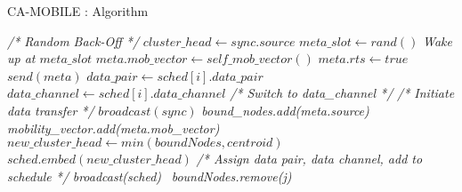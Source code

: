 \begin{algorithm}[H]
	\caption{CA-MOBILE : Algorithm}
	\label{algo:ca-mobile}
\begin{algorithmic}[1]
	\State \emph{/* Random Back-Off */}
	\State $cluster\_head \gets sync.source$
		\State $meta\_slot \gets rand()$
		\State \emph{Wake up at $meta\_slot$}
		\State $meta.mob\_vector \gets self\_mob\_vector()$
			\State $meta.rts \gets true$
		\EndIf
		\State $send(meta)$
				\State $data\_pair \gets sched[i].data\_pair$
				\State $data\_channel \gets sched[i].data\_channel$
			\EndIf
		\EndFor
		\State \emph{/* Switch to data\_channel */}
		\State \emph{/* Initiate data transfer */}
		\EndIf
	\EndWhile
	\Else
		\State $broadcast(sync)$
			\State \emph{bound\_nodes.add(meta.source)}
			\State \emph{mobility\_vector.add(meta.mob\_vector)}
		\EndWhile
		\State $new\_cluster\_head \leftarrow min(boundNodes,centroid)$
		\State $sched.embed(new\_cluster\_head)$
			\State \emph{/* Assign data pair, data channel, add to schedule */}
		\EndFor
		\State \emph{broadcast(sched)}
			\Else\ \emph{boundNodes.remove(j)}
	\EndWhile
	\EndIf
\EndProcedure
\end{algorithmic}
\end{algorithm}

